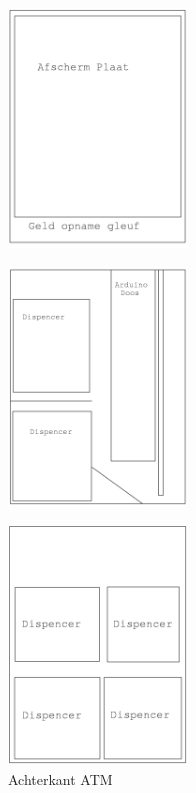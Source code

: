 \documentclass{article}
\begin{document}
\begin{figure}[H]
\centering
\begin{minipage}{.5\textwidth}
  \centering
  \includegraphics[height=2.5in]{voorkant.png}
  \label{fig:voorkant}
\end{minipage}%
\begin{minipage}{.5\textwidth}
  \centering
  \includegraphics[height=2.5in]{zijkant.png}
  \label{fig:zijkant}
\end{minipage}
\end{figure}

\begin{figure}[H]
       \centering
       \includegraphics[height=2.5in]{achterkant.png}
       \caption{Achterkant ATM}
       \label{fig: Achteraanzicht ATM}
\end{figure}
\end{document}
